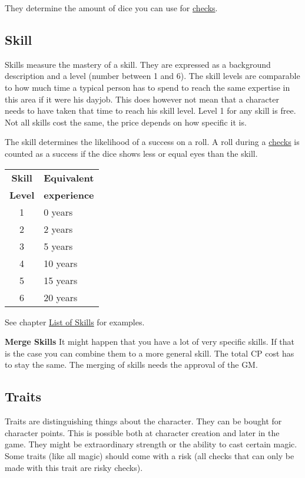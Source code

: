 \documentclass[11pt]{article}
\begin{document}
{\begin{multicols}{2}[]
They determine the amount of dice you can use for \hyperref[sec:orgad1fc8e]{checks}. 

\subsection{Skill}
\label{sec:org992c1d2}

Skills measure the mastery of a skill. They are expressed as a background description and a level (number between 1 and 6). The skill levels are comparable to how much time a typical person has to spend to reach the same expertise in this area if it were his dayjob. This does however not mean that a character needs to have taken that time to reach his skill level. Level 1 for any skill is free. Not all skills cost the same, the price depends on how specific it is.

The skill determines the likelihood of a success on a roll. A roll during a \hyperref[sec:orgad1fc8e]{checks} is counted as a success if the dice shows less or equal eyes than the skill.


\begin{center}
\begin{tabular}{c|l}
\textbf{Skill} & \textbf{Equivalent}\\
\textbf{Level} & \textbf{experience}\\
\hline
1 & 0 years\\
2 & 2 years\\
3 & 5 years\\
4 & 10 years\\
5 & 15 years\\
6 & 20 years\\
\end{tabular}
\end{center}

See chapter \hyperref[sec:orgfab9a60]{List of Skills} for examples.

\textbf{Merge Skills}
It might happen that you have a lot of very specific skills. If that is the case you can combine them to a more general skill. The total CP cost has to stay the same. The merging of skills needs the approval of the GM.

\subsection{Traits}
\label{sec:org251a3c5}
Traits are distinguishing things about the character. They can be bought for character points. This is possible both at character creation and later in the game.
They might be extraordinary strength or the ability to cast certain magic. Some traits (like all magic) should come with a risk (all checks that can only be made with this trait are risky checks).


\end{multicols}}
\end{document}
